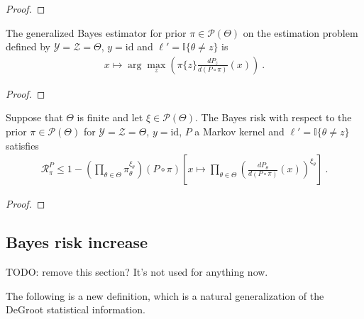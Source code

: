 \begin{proof}%
{}

\end{proof}


\begin{lemma}
  \label{lem:genBayesEstimator_binary}
  The generalized Bayes estimator for prior $\pi \in \mathcal P(\Theta)$ on the estimation problem defined by $\mathcal Y = \mathcal Z = \Theta$, $y = \mathrm{id}$ and $\ell' = \mathbb{I}\{\theta \ne z\}$ is
  \begin{align*}
  x \mapsto \arg\max_z \left( \pi\{z\} \frac{d P_z}{d (P \circ \pi)}(x) \right)
  \: .
  \end{align*}
\end{lemma}

\begin{proof}%
{}

\end{proof}


\begin{lemma}
  \label{lem:bayesRisk_binary_le_sub_prod}
  Suppose that $\Theta$ is finite and let $\xi \in \mathcal P(\Theta)$.
  The Bayes risk with respect to the prior $\pi \in \mathcal P(\Theta)$ for $\mathcal Y = \mathcal Z = \Theta$, $y = \mathrm{id}$, $P$ a Markov kernel and $\ell' = \mathbb{I}\{\theta \ne z\}$ satisfies
  \begin{align*}
  \mathcal R^P_\pi \le 1 - \left(\prod_{\theta \in \Theta} \pi_\theta^{\xi_\theta}\right) (P \circ \pi)\left[x \mapsto \prod_{\theta \in \Theta} \left(\frac{d P_\theta}{d (P \circ \pi)}(x)\right)^{\xi_\theta} \right]
  \: .
  \end{align*}
\end{lemma}

\begin{proof}%
{}

\end{proof}


\subsection{Bayes risk increase}

TODO: remove this section? It's not used for anything now.

The following is a new definition, which is a natural generalization of the DeGroot statistical information.

